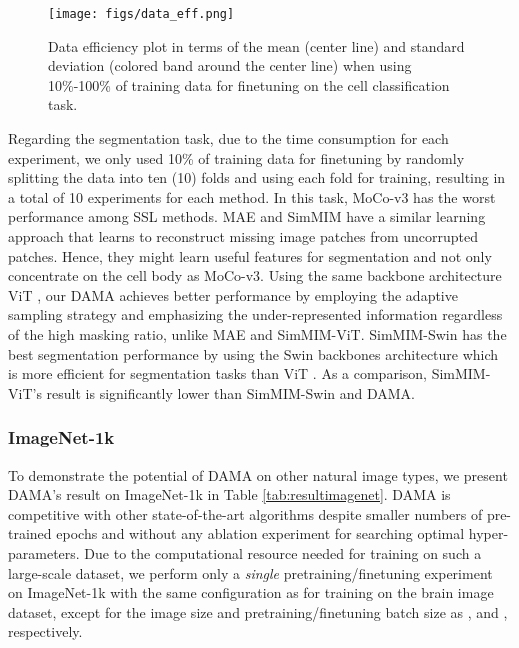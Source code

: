 \documentclass[10pt,twocolumn,letterpaper]{article}
\begin{document}
\begin{figure}[]
\centering
\texttt{[image: figs/data\_eff.png]}
\caption{Data efficiency plot in terms of the mean (center line) and standard deviation (colored band around the center line) when using 10\%-100\% of training data for finetuning on the cell classification task.}
\label{fig:dataeff}
\vspace{-10pt}
\end{figure}


Regarding the segmentation task, due to the time consumption for each experiment, we only used 10\% of training data for finetuning by randomly splitting the data into ten (10) folds and using each fold for training, resulting in a total of 10 experiments for each method. In this task, MoCo-v3 has the worst performance among SSL methods. MAE \cite{mae} and SimMIM \cite{simmim} have a similar learning approach that learns to reconstruct missing image patches from uncorrupted patches. Hence, they might learn useful features for segmentation and not only concentrate on the cell body as MoCo-v3. Using the same backbone architecture ViT \cite{vit}, our DAMA achieves better performance by employing the adaptive sampling strategy and emphasizing the under-represented information regardless of the high masking ratio, unlike MAE and SimMIM-ViT. SimMIM-Swin has the best segmentation performance by using the Swin \cite{swin} backbones architecture which is more efficient for segmentation tasks than ViT \cite{swin,simmim}. As a comparison, SimMIM-ViT's result is significantly lower than SimMIM-Swin and DAMA.

\subsubsection{ImageNet-1k} To demonstrate the potential of DAMA on other natural image types, we present DAMA's result on ImageNet-1k \cite{imagenet} in Table \ref{tab:resultimagenet}. DAMA is competitive with other state-of-the-art algorithms despite smaller numbers of pre-trained epochs and without any ablation experiment for searching optimal hyper-parameters. Due to the computational resource needed for training on such a large-scale dataset, we perform only a \textit{single} pretraining/finetuning experiment on ImageNet-1k with the same configuration as for training on the brain image dataset, except for the image size and pretraining/finetuning batch size as , and , respectively.
\end{document}
